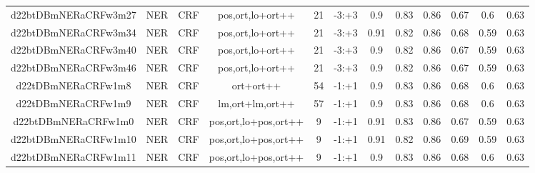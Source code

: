 \documentclass[a4paper]{article}
\begin{document}
\begin{landscape}
\begin{center}
\begin{tabular}{ |c|c|c|c|c|c|c|c|c|c|c|c|}
 
 	
 	\small{ d22btDBmNERaCRFw3m27 } & \small{ NER} & \small{  CRF }  & pos,ort,lo+ort++  &  21 &  \small{  -3:+3 }  &  0.9 & 0.83 & 0.86  &  0.67 & 0.6 & 0.63 \\
 	

 
 	
 	\small{ d22btDBmNERaCRFw3m34 } & \small{ NER} & \small{  CRF }  & pos,ort,lo+ort++  &  21 &  \small{  -3:+3 }  &  0.91 & 0.82 & 0.86  &  0.68 & 0.59 & 0.63 \\
 	

 
 	
 	\small{ d22btDBmNERaCRFw3m40 } & \small{ NER} & \small{  CRF }  & pos,ort,lo+ort++  &  21 &  \small{  -3:+3 }  &  0.9 & 0.82 & 0.86  &  0.67 & 0.59 & 0.63 \\
 	

 
 	
 	\small{ d22btDBmNERaCRFw3m46 } & \small{ NER} & \small{  CRF }  & pos,ort,lo+ort++  &  21 &  \small{  -3:+3 }  &  0.9 & 0.82 & 0.86  &  0.67 & 0.59 & 0.63 \\
 	

 
 	
 	\small{ d22tDBmNERaCRFw1m8 } & \small{ NER} & \small{  CRF }  & ort+ort++  &  54 &  \small{  -1:+1 }  &  0.9 & 0.83 & 0.86  &  0.68 & 0.6 & 0.63 \\
 	

 
 	
 	\small{ d22tDBmNERaCRFw1m9 } & \small{ NER} & \small{  CRF }  & lm,ort+lm,ort++  &  57 &  \small{  -1:+1 }  &  0.9 & 0.83 & 0.86  &  0.68 & 0.6 & 0.63 \\
 	

 
 	
 	\small{ d22btDBmNERaCRFw1m0 } & \small{ NER} & \small{  CRF }  & pos,ort,lo+pos,ort++  &  9 &  \small{  -1:+1 }  &  0.91 & 0.83 & 0.86  &  0.67 & 0.59 & 0.63 \\
 	

 
 	
 	\small{ d22btDBmNERaCRFw1m10 } & \small{ NER} & \small{  CRF }  & pos,ort,lo+pos,ort++  &  9 &  \small{  -1:+1 }  &  0.91 & 0.82 & 0.86  &  0.69 & 0.59 & 0.63 \\
 	

 
 	
 	\small{ d22btDBmNERaCRFw1m11 } & \small{ NER} & \small{  CRF }  & pos,ort,lo+pos,ort++  &  9 &  \small{  -1:+1 }  &  0.9 & 0.83 & 0.86  &  0.68 & 0.6 & 0.63 \\
 	

 
 	

\end{tabular}
\end{center}
\end{landscape}
\end{document}
